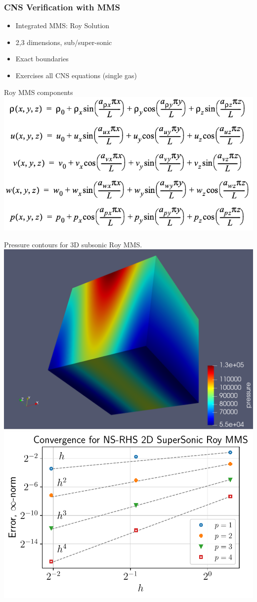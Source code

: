 \begin{frame}\frametitle{CNS Verification with MMS}
  \begin{multicols}{2}
  \begin{itemize}
  \item Integrated MMS: Roy Solution
  \item 2,3 dimensions, sub/super-sonic
  \item Exact boundaries
  \item Exercises all CNS equations (single gas)
  \end{itemize}
  \begin{center}
  \vspace*{-5pt}
  \tiny{Roy MMS components}
  \includegraphics[width=.4\textwidth]{Figures/mtc/RoySoln.png}
  \end{center}
  \columnbreak
  \vspace*{-35pt}
  \begin{center}
  \tiny{Pressure contours for 3D subsonic Roy MMS.}
  \includegraphics[width=.3\textwidth]{Figures/mtc/RoyPressure3D.png}\\
  \vspace*{10pt}
  \includegraphics[width=.35\textwidth]{Figures/mtc/roy_convergence.pdf}
  \end{center}
  \end{multicols}
  \begin{center}
  \vspace*{-10pt}
  \begin{minipage}{.8\textwidth}
  \end{minipage}
  \end{center}
\end{frame}

